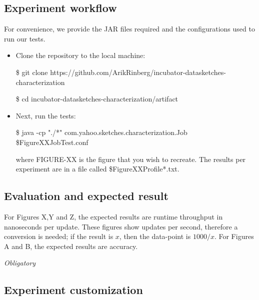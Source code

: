 \documentclass{sigplanconf}
\begin{document}
{%
\subsection{Experiment workflow}
For convenience, we provide the JAR files required and the configurations
used to run our tests.

\begin{itemize}
  \item Clone the repository to the local machine:

  \hrulefill

  \$ git clone https://github.com/ArikRinberg/incubator-datasketches-characterization

  \$ cd incubator-datasketches-characterization/artifact

  \hrulefill

  \item Next, run the tests:

  \hrulefill

  \$ java -cp "./*" com.yahoo.sketches.characterization.Job \${FigureXX}JobTest.conf

  \hrulefill

  \noindent where FIGURE-XX is the figure that you wish to recreate. The results per
  experiment are in a file called \${FigureXX}Profile*.txt. 

\end{itemize}

\subsection{Evaluation and expected result}

For Figures X,Y and Z, the expected results are runtime throughput in nanoseconds
per update. These figures show updates per second, therefore a conversion is needed;
if the result is $x$, then the data-point is $1000/x$. For Figures A and B, the
expected results are accuracy.

{\em Obligatory}

\subsection{Experiment customization}

}
\end{document}
